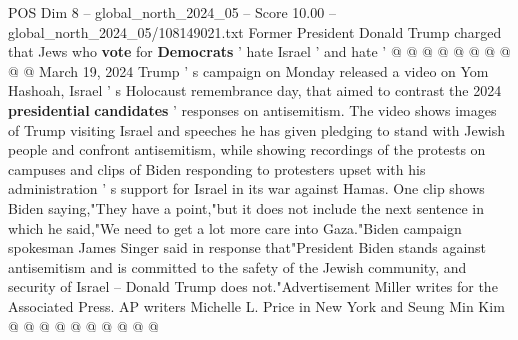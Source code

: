 \begin{textsample}{POS Dim 8 – global\_north\_2024\_05 – Score 10.00 – global\_north\_2024\_05/108149021.txt}
Former President Donald Trump charged that Jews who \textbf{vote} for \textbf{Democrats} ' hate Israel ' and hate ' @ @ @ @ @ @ @ @ @ @ March 19, 2024 Trump ' s campaign on Monday released a video on Yom Hashoah, Israel ' s Holocaust remembrance day, that aimed to contrast the 2024 \textbf{presidential} \textbf{candidates} ' responses on antisemitism.
The video shows images of Trump visiting Israel and speeches he has given pledging to stand with Jewish people and confront antisemitism, while showing recordings of the protests on campuses and clips of Biden responding to protesters upset with his administration ' s support for Israel in its war against Hamas.
One clip shows Biden saying,"They have a point,"but it does not include the next sentence in which he said,"We need to get a lot more care into Gaza."Biden campaign spokesman James Singer said in response that"President Biden stands against antisemitism and is committed to the safety of the Jewish community, and security of Israel -- Donald Trump does not."Advertisement Miller writes for the Associated Press.
AP writers Michelle L.
Price in New York and Seung Min Kim @ @ @ @ @ @ @ @ @ @

\end{textsample}
